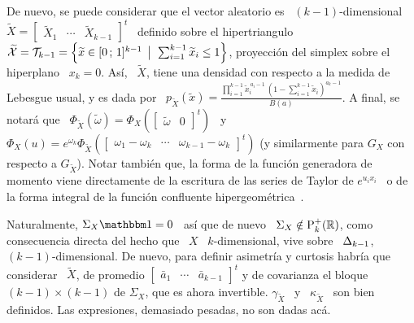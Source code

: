 
De nuevo, se puede considerar que el vector aleatorio es \ $(k-1)$-dimensional \
$\widetilde{X}     =    \begin{bmatrix}     \widetilde{X}_1    &     \cdots    &
  \widetilde{X}_{k-1}  \end{bmatrix}^t$  \ definido  sobre  el hipertriangulo  \
$\widetilde{\mathcal{X}}  = \mathcal{T}_{k-1}  = \left\{  \widetilde{x} \in  [0 \, ; \,  1]^{k-1} \:\: \big| \:\:
  \sum_{i=1}^{k-1}  \widetilde{x}_i \le  1 \right\}$,  proyecci\'on  del simplex
sobre el  hiperplano \ $x_k =  0$. As\'i, \ $\widetilde{X}$,  tiene una densidad
con   respecto   a   la  medida   de   Lebesgue   usual,   y   es  dada   por   \
$p_{\widetilde{X}}\left(   \widetilde{x}   \right)   =   \frac{\prod_{i=1}^{k-1}
  \widetilde{x}_i^{\,  a_i-1}  \, \left(  1  - \sum_{i=1}^{k-1}  \widetilde{x}_i
  \right)^{a_k-1}}{B(a)}$.      A      final,     se     notar\'a      que     \
$\Phi_{\widetilde{X}}\left(         \widetilde{\omega}         \right)         =
\Phi_X\left( \begin{bmatrix} \widetilde{\omega} & 0 \end{bmatrix}^t \right)$ \ y
\ $\Phi_X(u) =  e^{\omega_k} \Phi_{\widetilde{X}}\left( \begin{bmatrix} \omega_1
    - \omega_k  & \cdots &  \omega_{k-1} - \omega_k \end{bmatrix}^t  \right)$ (y
similarmente  para $G_X$  con respecto  a $G_{\widetilde{X}}$).   Notar tambi\'en
que, la  forma de la  funci\'on generadora de  momento viene directamente  de la
escritura de las series  de Taylor de $e^{u_i x_i}$ \ o  de la forma integral de
la funci\'on confluente hipergeom\'etrica~\cite{Phi88}.

Naturalmente,  $\Sigma_X \un  = 0$  \  as\'i que  de nuevo  \ $\Sigma_X  \notin
\mathrm{P}_k^+(\mathbb{R})$, como consecuencia directa del  hecho que \ $X$ \ $k$-dimensional,
vive  sobre   \  $\Delta_{k-1}$,  $(k-1)$-dimensional.  De   nuevo,  para  definir
asimetr\'ia y  curtosis habr\'ia que  considerar \ $\widetilde{X}$,  de promedio
$\begin{bmatrix}  \bar{a}_1  &  \cdots  & \bar{a}_{k-1}  \end{bmatrix}^t$  y  de
covarianza  el  bloque  $(k-1)  \times   (k-1)$  de  $\Sigma_X$,  que  es  ahora
invertible. $\gamma_{\widetilde{X}}$  \ y \ $\kappa_{\widetilde{X}}$  \ son bien
definidos. Las expresiones, demasiado pesadas, no son dadas ac\'a.

